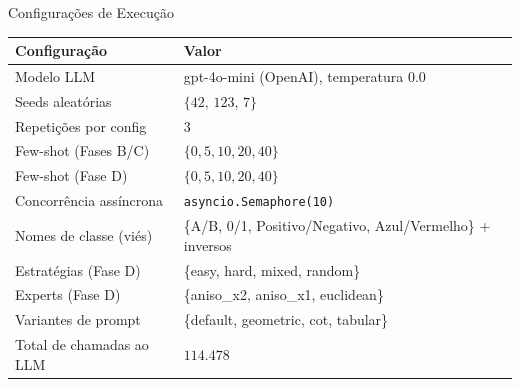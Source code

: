 \documentclass[aspectratio=169,10pt]{beamer}
\begin{document}
\begin{frame}{Configura\c{c}\~oes de Execu\c{c}\~ao}
  \footnotesize
  \begin{center}
  \begin{tabular}{ll}
    \toprule
    \textbf{Configura\c{c}\~ao} & \textbf{Valor} \\
    \midrule
    Modelo LLM & gpt-4o-mini (OpenAI), temperatura $0.0$ \\
    Seeds aleat\'orias & $\{42,\, 123,\, 7\}$ \\
    Repeti\c{c}\~oes por config & $3$ \\
    Few-shot (Fases B/C) & $\{0, 5, 10, 20, 40\}$ \\
    Few-shot (Fase D) & $\{0, 5, 10, 20, 40\}$ \\
    Concorr\^encia ass\'incrona & \texttt{asyncio.Semaphore(10)} \\
    Nomes de classe (viés) & \{A/B, 0/1, Positivo/Negativo, Azul/Vermelho\} + inversos \\
    Estrat\'egias (Fase D) & \{easy, hard, mixed, random\} \\
    Experts (Fase D) & \{aniso\_x2, aniso\_x1, euclidean\} \\
    Variantes de prompt & \{default, geometric, cot, tabular\} \\
    Total de chamadas ao LLM & $114.478$ \\
    \bottomrule
  \end{tabular}
  \end{center}
\end{frame}
\end{document}
